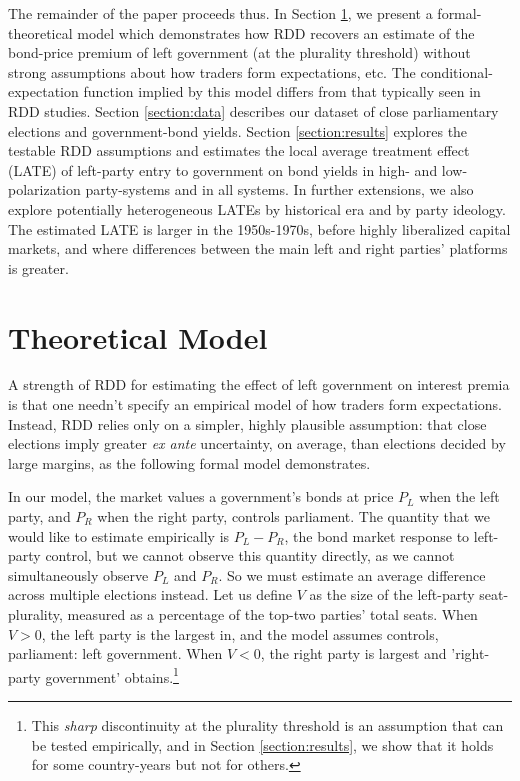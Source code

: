 \documentclass[12pt]{article}
\begin{document}
The remainder of the paper proceeds thus. In Section \ref{section:formal_model}, we present a formal-theoretical model which demonstrates how RDD recovers an estimate of the bond-price premium of left government (at the plurality threshold) without strong assumptions about how traders form expectations, etc. The conditional-expectation function implied by this model differs from that typically seen in RDD studies. Section \ref{section:data} describes our dataset of close parliamentary elections and government-bond yields. Section \ref{section:results} explores the testable RDD assumptions and estimates the local average treatment effect (LATE) of left-party entry to government on bond yields in high- and low-polarization party-systems and in all systems. In further extensions, we also explore potentially heterogeneous LATEs by historical era and by party ideology. The estimated LATE is larger in the 1950s-1970s, before highly liberalized capital markets, and where differences between the main left and right parties' platforms is greater.



\section{Theoretical Model} \label{section:formal_model}

A strength of RDD for estimating the effect of left government on interest premia is that one needn't specify an empirical model of how traders form expectations. Instead, RDD relies only on a simpler, highly plausible assumption: that close elections imply greater \textit{ex ante} uncertainty, on average, than elections decided by large margins, as the following formal model demonstrates.

In our model, the market values a government's bonds at price $P_L$ when the left party, and $P_R$ when the right party, controls parliament. The quantity that we would like to estimate empirically is $P_L - P_R$, the bond market response to left-party control, but we cannot observe this quantity directly, as we cannot simultaneously observe $P_L$ and $P_R$. So we must estimate an average difference across multiple elections instead. Let us define $V$ as the size of the left-party seat-plurality, measured as a percentage of the top-two parties' total seats. When $V > 0$, the left party is the largest in, and the model assumes controls, parliament: left government. When $V < 0$, the right party is largest and 'right-party government' obtains.\footnote{This \textit{sharp} discontinuity at the plurality threshold is an assumption that can be tested empirically, and in Section \ref{section:results}, we show that it holds for some country-years but not for others.}
\end{document}

